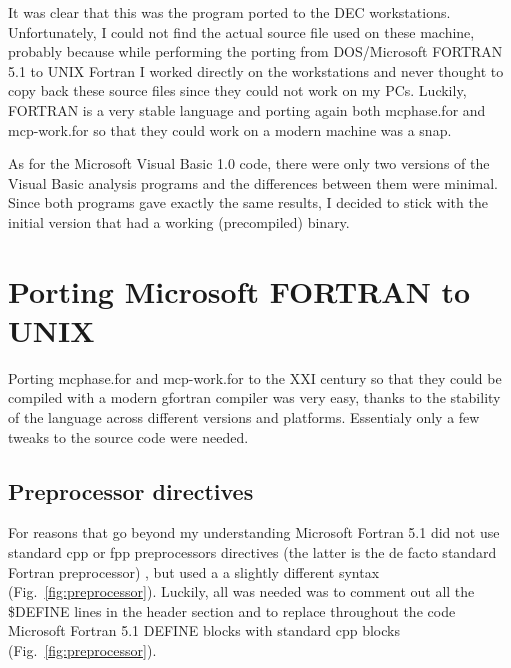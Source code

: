 It was clear that this was the program ported to the DEC workstations. 
Unfortunately, I could not find the actual source file used on these machine, probably because while performing the porting from DOS/Microsoft FORTRAN 5.1 to UNIX Fortran I worked directly on the workstations and never thought to copy back these source files since they could not work on my PCs.
Luckily, FORTRAN is a very stable language and porting again both \textsf{mcphase.for} and \textsf{mcp-work.for} so that they could work on a modern machine was a snap.

As for the Microsoft Visual Basic 1.0 code, there were only two versions of the Visual Basic analysis programs and the differences between them were minimal. Since both programs gave exactly the same results, I decided to stick with the initial version that had a working (precompiled) binary.


\section{Porting Microsoft FORTRAN to UNIX}

Porting \textsf{mcphase.for} and \textsf{mcp-work.for} to the XXI century so that they could be compiled with a modern \textsf{gfortran} compiler was very easy, thanks to the stability of the language across different versions and platforms. Essentialy only a few tweaks to the source code were needed.


\subsection{Preprocessor directives}

For reasons that go beyond my understanding Microsoft Fortran 5.1 did not use standard \textsf{cpp} or \textsf{fpp} preprocessors directives (the latter is the de facto standard Fortran preprocessor) \cite{Boyanski:1992}, but used a a slightly different syntax (Fig.~\ref{fig:preprocessor}). Luckily, all was needed was to comment out all the \textsf{\$DEFINE} lines in the header section and to replace throughout the code Microsoft Fortran 5.1 \textsf{DEFINE} blocks with standard \textsf{cpp} blocks (Fig.~\ref{fig:preprocessor}). 


